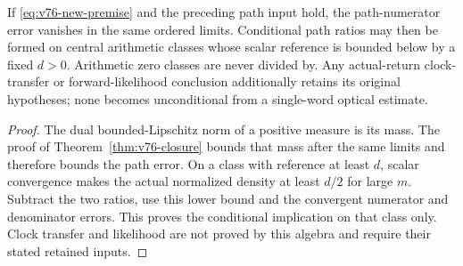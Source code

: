 \begin{corollary}
\label{cor:v76-path}
If \eqref{eq:v76-new-premise} and the preceding path input hold,
the path-numerator error vanishes in the same ordered limits.
Conditional path ratios may then be formed on central arithmetic
classes whose scalar reference is bounded below by a fixed $d>0$.
Arithmetic zero classes are never divided by. Any actual-return
clock-transfer or forward-likelihood conclusion additionally retains
its original hypotheses; none becomes unconditional from a
single-word optical estimate.
\end{corollary}
\begin{proof}
The dual bounded-Lipschitz norm of a positive measure is its mass.
The proof of Theorem~\ref{thm:v76-closure} bounds that mass after
the same limits and therefore bounds the path error. On a class
with reference at least $d$, scalar convergence makes the actual
normalized density at least $d/2$ for large $m$. Subtract the two
ratios, use this lower bound and the convergent numerator and
denominator errors. This proves the conditional implication on
that class only. Clock transfer and likelihood are not proved by
this algebra and require their stated retained inputs.
\end{proof}
